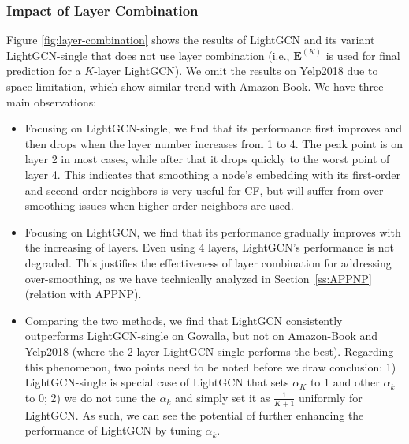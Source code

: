 \documentclass[sigconf]{acmart}
\theoremstyle{definition}
\begin{document}
\subsubsection{Impact of Layer Combination} Figure \ref{fig:layer-combination} shows the results of LightGCN and its variant LightGCN-single that does not use layer combination (i.e., $\textbf{E}^{(K)}$ is used for final prediction for a $K$-layer LightGCN). We omit the results on Yelp2018 due to space limitation, which show similar trend with Amazon-Book. We have three main observations:
\begin{itemize}[leftmargin=*]
\item Focusing on LightGCN-single, we find that its performance first improves and then drops when the layer number increases from 1 to 4. The peak point is on layer 2 in most cases, while after that it drops quickly to the worst point of layer 4. This indicates that smoothing a node's embedding with its first-order and second-order neighbors is very useful for CF, but will suffer from over-smoothing issues when higher-order neighbors are used. 
\item Focusing on LightGCN, we find that its performance gradually improves with the increasing of layers. Even using 4 layers, LightGCN's performance is not degraded. This justifies the effectiveness of layer combination for addressing over-smoothing, as we have technically analyzed in Section~\ref{ss:APPNP} (relation with APPNP). 
\item Comparing the two methods, we find that LightGCN consistently outperforms LightGCN-single on Gowalla, but not on Amazon-Book and Yelp2018 (where the 2-layer LightGCN-single performs the best). Regarding this phenomenon, two points need to be noted before we draw conclusion: 1) LightGCN-single is special case of LightGCN that sets $\alpha_K$ to 1 and other $\alpha_k$ to 0; 2) we do not tune the $\alpha_k$ and simply set it as $\frac{1}{K+1}$ uniformly for LightGCN. As such, we can see the potential of further enhancing the performance of LightGCN by tuning $\alpha_k$. 
\end{itemize}
\end{document}
